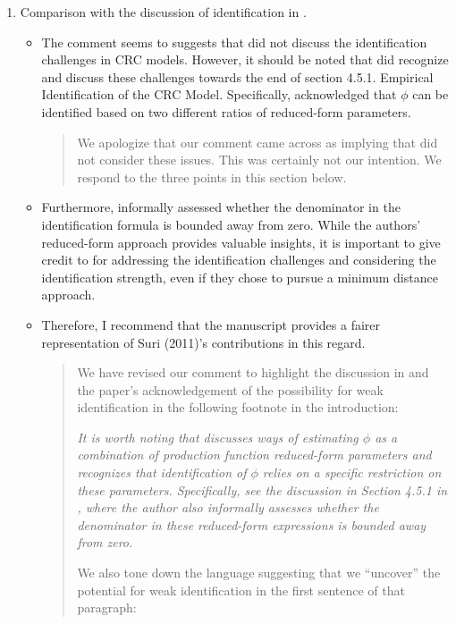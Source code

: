 \documentclass{article}[11pt]
\begin{document}
\begin{enumerate}
  \item Comparison with the discussion of identification in \citet{S2011}.
    \begin{itemize}
      \item The comment seems to suggests that \citet{S2011} did not discuss the identification challenges in CRC models. However, it should be noted that \citet{S2011} did recognize and discuss these challenges towards the end of section 4.5.1. Empirical Identification of the CRC Model. Specifically, \citet{S2011} acknowledged that $\phi$ can be identified based on two different ratios of reduced-form parameters. 
      \begin{quote}
        We apologize that our comment came across as implying that \citet{S2011} did not consider these issues. 
        This was certainly not our intention.
        We respond to the three points in this section below.
    \end{quote}
      \item Furthermore, \citet{S2011} informally assessed whether the denominator in the identification formula is bounded away from zero. While the authors' reduced-form approach provides valuable insights, it is important to give credit to \citet{S2011} for addressing the identification challenges and considering the identification strength, even if they chose to pursue a minimum distance approach.
      \item Therefore, I recommend that the manuscript provides a fairer representation of Suri (2011)'s contributions in this regard.
      \begin{quote}
        We have revised our comment to highlight the discussion in \citet{S2011} and the paper's acknowledgement of the possibility for weak identification in the following footnote in the introduction:
        
        \textit{It is worth noting that \citet{S2011} discusses ways of estimating $\phi$ as a combination of production function reduced-form parameters and recognizes that identification of $\phi$ relies on a specific restriction on these parameters. Specifically, see the discussion in Section 4.5.1 in \citet{S2011}, where the author also informally assesses whether the denominator in these reduced-form expressions is bounded away from zero.}

        We also tone down the language suggesting that we ``uncover'' the potential for weak identification in the first sentence of that paragraph:
        

\end{quote}
\end{itemize}
\end{enumerate}
\end{document}
